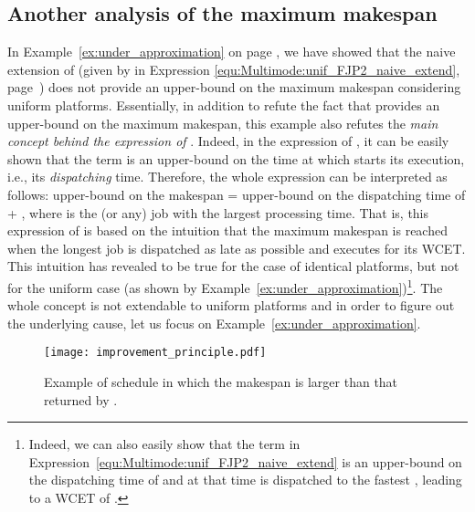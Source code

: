 \documentclass{article}
\newtheorem{validity test}{Validity Test}
\begin{document}
\subsection{Another analysis of the maximum makespan}
\label{sec:Multimode:unif_FJP2_improvements}

In Example~\ref{ex:under_approximation} on page \pageref{ex:under_approximation}, we have showed that the naive extension of  (given by  in Expression \ref{equ:Multimode:unif_FJP2_naive_extend}, page~\pageref{equ:Multimode:unif_FJP2_naive_extend}) does not provide an upper-bound on the maximum makespan considering uniform platforms. Essentially, in addition to refute the fact that  provides an upper-bound on the maximum makespan, this example also refutes the \emph{main concept behind the expression of }. Indeed, in the expression of , it can be easily shown that the term  is an upper-bound on the time at which  starts its execution, i.e., its \emph{dispatching} time. Therefore, the whole expression can be interpreted as follows: upper-bound on the makespan = upper-bound on the dispatching time of  + , where  is the (or any) job with the largest processing time. That is, this expression of  is based on the intuition that the maximum makespan is reached when the longest job is dispatched as late as possible and executes for its WCET. This intuition has revealed to be true for the case of identical platforms, but not for the uniform case (as shown by Example~\ref{ex:under_approximation})\footnote{Indeed, we can also easily show that the term  in Expression~\ref{equ:Multimode:unif_FJP2_naive_extend} is an upper-bound on the dispatching time of  and at that time  is dispatched to the fastest  , leading to a WCET of .}. The whole concept is not extendable to uniform platforms and in order to figure out the underlying cause, let us focus on Example~\ref{ex:under_approximation}.

\begin{figure}
\begin{center}
\texttt{[image: improvement\_principle.pdf]}
\caption{Example of schedule in which the makespan is larger than that returned by .}
\label{fig:Multimode:unif_FJP2_improvement_principle}
\end{center}
\end{figure}
\end{document}
